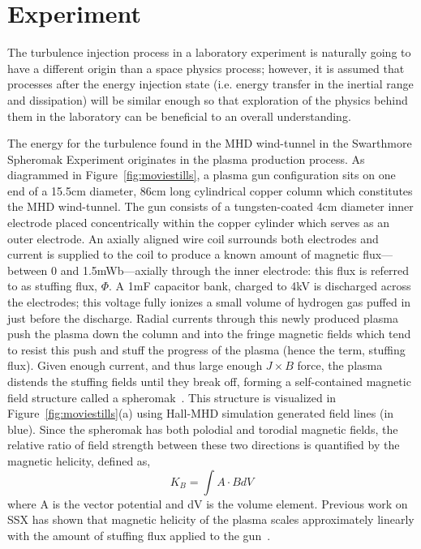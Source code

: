 \documentclass[aps,prl,amsmath,amssymb,reprint,superscriptaddress]{revtex4-1} %
\begin{document}
\section{Experiment}\label{sec:experiment}

The turbulence injection process in a laboratory experiment is naturally going to have a different origin than a space physics process; however, it is assumed that processes after the energy injection state (i.e. energy transfer in the inertial range and dissipation) will be similar enough so that exploration of the physics behind them in the laboratory can be beneficial to an overall understanding.

The energy for the turbulence found in the MHD wind-tunnel in the Swarthmore Spheromak Experiment originates in the plasma production process. As diagrammed in Figure~\ref{fig:moviestills}, a plasma gun configuration sits on one end of a 15.5cm diameter, 86cm long cylindrical copper column which constitutes the MHD wind-tunnel. The gun consists of a tungsten-coated 4cm diameter inner electrode placed concentrically within the copper cylinder which serves as an outer electrode. An axially aligned wire coil surrounds both electrodes and current is supplied to the coil to produce a known amount of magnetic flux---between 0 and 1.5mWb---axially through the inner electrode: this flux is referred to as stuffing flux, $\Phi$. A 1mF capacitor bank, charged to 4kV is discharged across the electrodes; this voltage fully ionizes a small volume of hydrogen gas puffed in just before the discharge. Radial currents through this newly produced plasma push the plasma down the column and into the fringe magnetic fields which tend to resist this push and stuff the progress of the plasma (hence the term, stuffing flux). Given enough current, and thus large enough $J\times B$ force, the plasma distends the stuffing fields until they break off, forming a self-contained magnetic field structure called a spheromak~\cite{barnes86,jarboe93}. This structure is visualized in Figure~\ref{fig:moviestills}(a) using Hall-MHD simulation generated field lines (in blue). Since the spheromak has both polodial and torodial magnetic fields, the relative ratio of field strength between these two directions is quantified by the magnetic helicity, defined as,
\begin{equation}
K_{B} = \int A \cdot B dV
\label{eq:helicity_th}
\end{equation}
where A is the vector potential and dV is the volume element. Previous work on SSX has shown that magnetic helicity of the plasma scales approximately linearly with the amount of stuffing flux applied to the gun~\cite{schaffner14b}.
\end{document}
